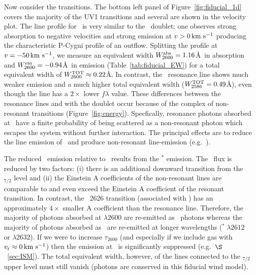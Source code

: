\documentclass[12pt,preprint]{aastex}
\begin{document}
Now consider the  transitions.
The bottom left panel of Figure~\ref{fig:fiducial_1d} covers the
majority of the  UV1 transitions and several are
shown in the velocity plot.  The line
profile for \feiib\ is very similar to the \mgiid\ doublet;
one observes strong absorption to negative velocities and strong
emission at $v > 0 \, {\rm km~s^{-1}}$ producing the characteristic P-Cygni profile of
an outflow.  Splitting
the profile at $v = -50 \, {\rm km~s^{-1}}$, we measure an equivalent width
$W_{2600}^{\rm abs} = 1.16$\AA\ in absorption and $W_{2600}^{\rm em} =
-0.94$\AA\ in emission (Table~\ref{tab:fiducial_EW}) for a total
equivalent width of $W_{2600}^{\rm TOT} \approx 0.22$\AA.  
In contrast, the \feiia\ resonance line shows much weaker emission and
a much higher total equivalent width ($W_{2586}^{\rm TOT} = 0.49$\AA),
even though the line has a $2 \times$ lower $f\lambda$ value.
These differences between the  resonance lines and with the
 doublet occur because of the complex of non-resonant
 transitions (Figure~\ref{fig:energy}).  Specfically,
resonance photons absorbed at \feiid\ have a finite probability of
being scattered as a non-resonant photon which escapes the system
without further interaction.  The principal effects are to reduce the
line emission of \feiid\ and produce non-resonant line-emission (e.g.\
\feiic).

The reduced \feiia\ emission relative to \feiib\ results from the
\ion{Fe}{2}$^*$ emission.
The \feiia\ flux is reduced by two factors:
(i) there is an additional downward transition from the
\zconfig$_{7/2}$ level and 
(ii) the Einstein A
coefficients of the non-resonant lines are comparable to and even
exceed the Einstein A coefficient of
the resonant transition.  In contrast, 
the ~2626 transition (associated with \feiib)
has an approximately  $4\times$ smaller A coefficient than the
resonance line.  Therefore, the majority of photons absorbed at
$\lambda 2600$ are re-emitted as \feiib\ photons whereas 
the majority of photons absorbed as \feiia\ are re-emitted 
at longer wavelengths ($^* \; \lambda 2612$ or $\lambda
2632$).
If we were to increase $\tau_{2600}$ (and especially if we include
gas with $v_{\rm r} \approx 0 \, {\rm km~s^{-1}}$) then the emission at \feiib\ is
significantly suppressed (e.g.\ $\S$~\ref{sec:ISM}).
The total equivalent width, however, of the lines connected to the
\zconfig$_{7/2}$ upper level must still vanish (photons are conserved
in this fiducial wind model).
\end{document}
